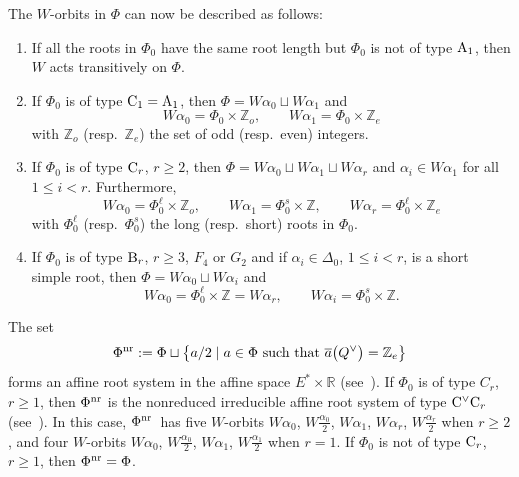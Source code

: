 The $W$-orbits in $\Phi$ can now be described as follows:
\begin{enumerate}\itemsep=0pt
\item[$(1)$] If all the roots in $\Phi_0$ have the same root length but $\Phi_0$ is not of type $\textup{A}_1$, then $W$ acts transitively on $\Phi$.
\item[$(2)$] If $\Phi_0$ is of type ${\rm C}_1=\textup{A}_1$, then $\Phi=W\alpha_0\sqcup W\alpha_1$ and
\[
W\alpha_0=\Phi_0\times\mathbb{Z}_o,\qquad W\alpha_1=\Phi_0\times\mathbb{Z}_e
\]
with $\mathbb{Z}_o$ (resp.\ $\mathbb{Z}_e$) the set of odd (resp.\ even) integers.
\item[$(3)$] If $\Phi_0$ is of type ${\rm C}_r$, $r\geq 2$, then $\Phi=W\alpha_0\sqcup W\alpha_1\sqcup W\alpha_r$ and $\alpha_i\in W\alpha_1$ for all $1\leq i<r$. Furthermore,
\[
W\alpha_0=\Phi_0^\ell\times\mathbb{Z}_o,\qquad W\alpha_1=\Phi_0^s\times\mathbb{Z},\qquad W\alpha_r=\Phi_0^\ell\times\mathbb{Z}_e
\]
with $\Phi_0^\ell$ (resp.\ $\Phi_0^s$) the long (resp.\ short) roots in $\Phi_0$.
\item[$(4)$] If $\Phi_0$ is of type $\textup{B}_r$, $r\geq 3$, $F_4$ or $G_2$ and if $\alpha_i\in\Delta_0$, $1\leq i<r$, is a short simple root, then $\Phi=W\alpha_0\sqcup W\alpha_i$ and
\[
W\alpha_0=\Phi_0^\ell\times\mathbb{Z}=W\alpha_r,\qquad W\alpha_i=\Phi_0^s\times\mathbb{Z}.
\]
\end{enumerate}
The set
\[
\Phi^{\textup{nr}}:=\Phi\sqcup\bigl\{a/2\mid a\in\Phi\ \textup{such that}\ \overline{a}\bigl(Q^\vee\bigr)=\mathbb{Z}_e\big\}
\]
forms an affine root system in the affine space $E^*\times\mathbb{R}$ (see~\cite{MacAff}). If $\Phi_0$ is of type $C_r$, $r\geq 1$, then $\Phi^{\textup{nr}}$ is the nonreduced irreducible affine root system of type ${\rm C}^\vee{\rm C}_r$ (see~\cite{MacAff}). In this case, $\Phi^{\textup{nr}}$~has five $W$-orbits $W\alpha_0$, $W\frac{\alpha_0}{2}$, $W\alpha_1$, $W\alpha_r$, $W\frac{\alpha_r}{2}$ when $r\geq 2$, and four $W$-orbits
$W\alpha_0$, $W\frac{\alpha_0}{2}$, $W\alpha_1$, $W\frac{\alpha_1}{2}$ when $r=1$. If $\Phi_0$ is not of type ${\rm C}_r$, $r\geq 1$, then $\Phi^{\textup{nr}}=\Phi$.

